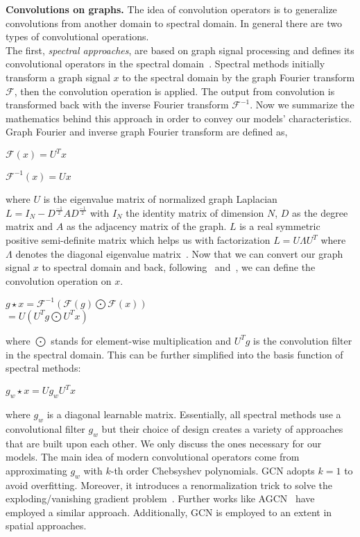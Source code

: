 \textbf{Convolutions on graphs.} The idea of convolution operators is to generalize convolutions from another domain to spectral domain. In general there are two types of convolutional operations.\\
The first, \emph{spectral approaches}, are based on graph signal processing and defines its convolutional operators in the spectral domain~\parencite{TheEmergingFieldOfSignalProcessingOnGraphs_Shuman}. Spectral methods initially transform a graph signal $x$ to the spectral domain by the graph Fourier transform $\mathcal{F}$, then the convolution operation is applied. The output from convolution is transformed back with the inverse Fourier transform $\mathcal{F}^{-1}$. Now we summarize the mathematics behind this approach in order to convey our models' characteristics. Graph Fourier and inverse graph Fourier transform are defined as,
\begin{center}
    $\mathcal{F}(x) = U^T x$
\end{center}
\begin{center}
    $\mathcal{F}^{-1}(x) = Ux$
\end{center}
where $U$ is the eigenvalue matrix of normalized graph Laplacian $L = I_N - D^{\frac{-1}{2}} A D^{\frac{-1}{2}}$ with $I_N$ the identity matrix of dimension $N$, $D$ as the degree matrix and $A$ as the adjacency matrix of the graph. $L$ is a real symmetric positive semi-definite matrix which helps us with factorization $L = U \Lambda U^T$ where $\Lambda$ denotes the diagonal eigenvalue matrix~\parencite{GNNsAReview_Zhou}. Now that we can convert our graph signal $x$ to spectral domain and back, following~\cite{AWaveletTourOfSignalProcessing_Mallat} and~\cite{GNNsAReview_Zhou}, we can define the convolution operation on $x$.
\begin{center}
    $g \star x = \mathcal{F}^{-1}(\mathcal{F}(g) \bigodot \mathcal{F}(x))$ \\ $= U(U^T g \bigodot U^T x)$
\end{center}
where $\bigodot$ stands for element-wise multiplication and $U^Tg$ is the convolution filter in the spectral domain. This can be further simplified into the basis function of spectral methods:
\begin{center}
    $g_w \star x = U g_w U^T x$
\end{center}
where $g_w$ is a diagonal learnable matrix. Essentially, all spectral methods use a convolutional filter $g_w$ but their choice of design creates a variety of approaches that are built upon each other. We only discuss the ones necessary for our models. The main idea of modern convolutional operators come from approximating $g_w$ with $k$-th order Chebsyshev polynomials. GCN adopts $k=1$ to avoid overfitting. Moreover, it introduces a renormalization trick to solve the exploding/vanishing gradient problem~\parencite{GCN_Kipf}. Further works like AGCN~\parencite{AGCN_Li} have employed a similar approach. Additionally, GCN is employed to an extent in spatial approaches.\\
